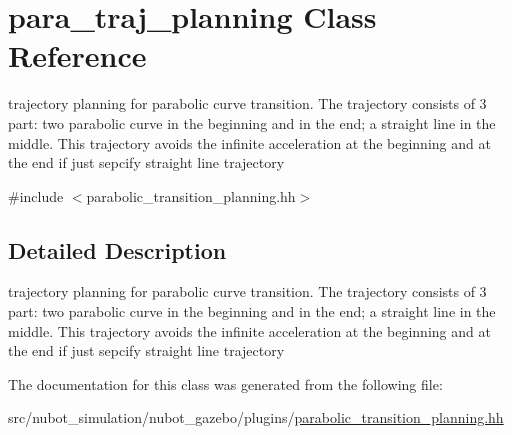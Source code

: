 \hypertarget{classpara__traj__planning}{\section{para\-\_\-traj\-\_\-planning Class Reference}
\label{classpara__traj__planning}
}


trajectory planning for parabolic curve transition. The trajectory consists of 3 part\-: two parabolic curve in the beginning and in the end; a straight line in the middle. This trajectory avoids the infinite acceleration at the beginning and at the end if just sepcify straight line trajectory  




{\ttfamily \#include $<$parabolic\-\_\-transition\-\_\-planning.\-hh$>$}



\subsection{Detailed Description}
trajectory planning for parabolic curve transition. The trajectory consists of 3 part\-: two parabolic curve in the beginning and in the end; a straight line in the middle. This trajectory avoids the infinite acceleration at the beginning and at the end if just sepcify straight line trajectory 

The documentation for this class was generated from the following file\-:\begin{DoxyCompactItemize}
\item 
src/nubot\-\_\-simulation/nubot\-\_\-gazebo/plugins/\hyperlink{parabolic__transition__planning_8hh}{parabolic\-\_\-transition\-\_\-planning.\-hh}\end{DoxyCompactItemize}
